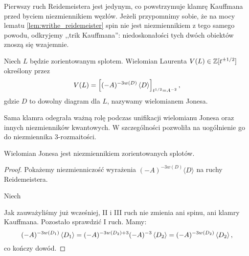 Pierwszy ruch Reidemeistera jest jedynym, co powstrzymuje klamrę Kauffmana przed byciem niezmiennikiem węzłów.
Jeżeli przypomnimy sobie, że na mocy lematu \ref{lem:writhe_reidemeister} spin nie jest niezmiennikiem z tego samego powodu, odkryjemy ,,trik Kauffmana'': niedoskonałości tych dwóch obiektów znoszą się wzajemnie.
%
%

\begin{definition}
\label{def:jones_polynomial}%
    Niech $L$ będzie zorientowanym splotem.
    Wielomian Laurenta $V(L) \in \mathbb Z[t^{\pm 1/2}]$ określony przez
    \begin{equation}
        V(L)=\left[(-A)^{-3w(D)} \left\langle{D}\right\rangle\right]_{t^{1/2}=A^{-2}},
    \end{equation}
    gdzie $D$ to dowolny diagram dla $L$, nazywamy wielomianem Jonesa.
\end{definition}

Sama klamra odegrała ważną rolę podczas unifikacji wielomianu Jonesa oraz innych niezmienników kwantowych.
W szczególności pozwoliła na uogólnienie go do niezmiennika 3-rozmaitości.

\begin{proposition}
    Wielomian Jonesa jest niezmiennikiem zorientowanych splotów.
\end{proposition}

\begin{proof}
    Pokażemy niezmienniczość wyrażenia $(-A)^{-3w(D)}\langle D\rangle$ na ruchy Reidemeistera.

    Niech
\begin{comment}
    \begin{equation}
        D_1 := \LargeReidemeisterOneLeft,
        \quad\quad\quad
        D_2 := \LargeReidemeisterOneStraight.
    \end{equation}
\end{comment}
    Jak zauważyliśmy już wcześniej, II i III ruch nie zmienia ani spinu, ani klamry Kauffmana.
    Pozostało sprawdzić I ruch.
    Mamy:
    \begin{equation}
        (-A)^{-3 w\left(D_1\right)} \left\langle{D_1}\right\rangle =
        (-A)^{-3 w\left(D_2\right) + 3} (-A)^{-3}\left\langle{D_2}\right\rangle =
        (-A)^{-3 w\left(D_2\right)} \left\langle{D_2}\right\rangle,
    \end{equation}
    co kończy dowód.
\end{proof}


